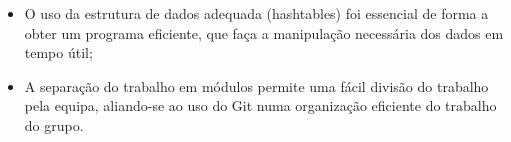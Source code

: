 \documentclass[a4paper]{article}
\begin{document}
\begin{itemize}
        \item O uso da estrutura de dados adequada (hashtables) foi essencial de forma a obter um programa eficiente, que faça a manipulação necessária dos dados em tempo útil;
 	    \item A separação do trabalho em módulos permite uma fácil divisão do trabalho pela equipa, aliando-se ao uso do Git numa organização eficiente do trabalho do grupo.
\end{itemize}
\end{document}
